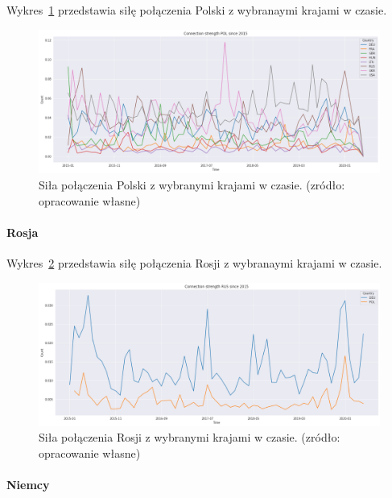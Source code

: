 \documentclass[11pt]{report}
\begin{document}
    Wykres~\ref{fig:PLConnection} przedstawia siłę połączenia Polski z wybranaymi krajami w czasie.


    \begin{figure}[ht]
        \centering
        \includegraphics[width=1 \textwidth]{fig/PL/POLConnection.png}
        \caption{Siła połączenia Polski z wybranymi krajami w czasie. (zródło: opracowanie własne)}
        \label{fig:PLConnection}
    \end{figure}

    \paragraph{Rosja}

    Wykres~\ref{fig:RUSConnection} przedstawia siłę połączenia Rosji z wybranaymi krajami w czasie.

    \begin{figure}[ht]
        \centering
        \includegraphics[width=1 \textwidth]{fig/RUS/RUSConnection.png}
        \caption{Siła połączenia Rosji z wybranymi krajami w czasie. (zródło: opracowanie własne)}
        \label{fig:RUSConnection}
    \end{figure}

    \paragraph{Niemcy}
\end{document}
